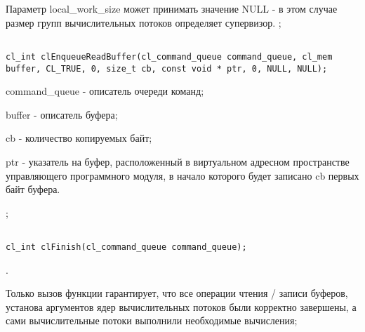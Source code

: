 \begin{enumerate}
\begin{enumerate}
{						Параметр local\_work\_size может принимать значение NULL - в этом случае размер групп вычислительных потоков определяет супервизор.
				}
				{\openclsuccess;}


			\end{enumerate}



\begin{lstlisting}

cl_int clEnqueueReadBuffer(cl_command_queue command_queue, cl_mem buffer, CL_TRUE, 0, size_t cb, const void * ptr, 0, NULL, NULL);

\end{lstlisting}

		\openclend
		{
			\item command\_queue - описатель очереди команд;
			\item buffer - описатель буфера;
			\item cb - количество копируемых байт;
			\item ptr - указатель на буфер, расположенный в виртуальном адресном пространстве управляющего программного модуля, в начало которого будет записано cb первых байт буфера.
		}
		{\openclsuccess;}



\begin{lstlisting}

cl_int clFinish(cl_command_queue command_queue);

\end{lstlisting}

		{
		\openclsuccess.

		Только вызов функции \openclfunc гарантирует, что все операции чтения / записи буферов, установа аргументов ядер вычислительных потоков были корректно завершены, а сами вычислительные потоки выполнили необходимые вычисления;
		}


\end{enumerate}
